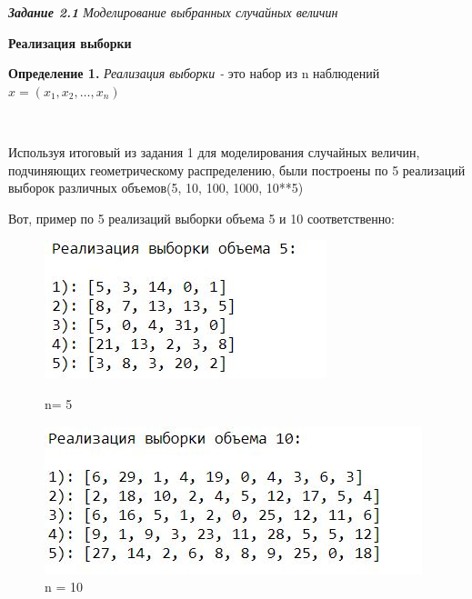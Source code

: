 \documentclass[a4paper,12pt, oneside]{book}
\begin{document}
\newpage
{\large\textit{\textbf{Задание 2.1} Моделирование выбранных случайных величин}}

\vspace{5mm}
	\large{\textbf{Реализация выборки}}
\vspace{5mm}

\normalsize{\textbf{Определение 1.}} \textit{Реализация выборки - }это набор из n наблюдений $\hat{x} = (x_1, x_2, \ldots, x_n)$

\vspace{5mm}
\\
\vspace{5mm}

Используя итоговый из задания 1 для моделирования случайных величин, подчиняющих геометрическому распределению, были построены по 5 реализаций выборок различных объемов(5, 10, 100, 1000, 10**5)
\vspace{5mm}

Вот, пример по  5 реализаций выборки объема 5 и  10 соответственно:

\begin{figure}[h]
	\begin{center}
		\begin{minipage}[h]{0.4\linewidth}
			\includegraphics[width=1\linewidth]{vibor_5.jpg}
			\caption{n= 5} %
			\label{ris:experimoriginal} %
		\end{minipage}
		\hfill
		\begin{minipage}[h]{0.4\linewidth}
			\includegraphics[width=1\linewidth]{vibor_10.jpg}
			\caption{n = 10}
			\label{ris:experimcoded}
		\end{minipage}
	\end{center}
\end{figure}
\end{document}

